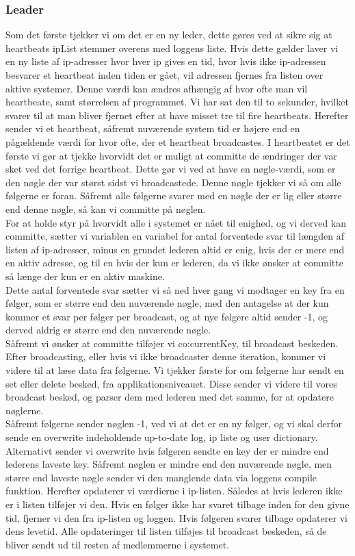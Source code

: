 \documentclass[a4paper,12pt]{article}
\begin{document}
\subsubsection{Leader}
Som det første tjekker vi om det er en ny leder, dette gøres ved at sikre sig at heartbeats ipList stemmer overens med loggens liste. Hvis dette gælder laver vi en ny liste af ip-adresser hvor hver ip gives en tid, hvor hvis ikke ip-adressen besvarer et heartbeat inden tiden er gået, vil adressen fjernes fra listen over aktive systemer. Denne værdi kan ændres afhængig af hvor ofte man vil heartbeate, samt størrelsen af programmet. Vi har sat den til to sekunder, hvilket svarer til at man bliver fjernet efter at have misset tre til fire heartbeats. 
Herefter sender vi et heartbeat, såfremt nuværende system tid er højere end en pågældende værdi for hvor ofte, der et heartbeat broadcastes. I heartbeatet er det første vi gør at tjekke hvorvidt det er muligt at committe de ændringer der var sket ved det forrige heartbeat. Dette gør vi ved at have en nøgle-værdi, som er den nøgle der var størst sidst vi broadcastede. Denne nøgle tjekker vi så om alle følgerne er foran. Såfremt alle følgerne svarer med en nøgle der er lig eller større end denne nøgle, så kan vi committe på nøglen.
\\
For at holde styr på hvorvidt alle i systemet er nået til enighed, og vi derved kan committe, sætter vi variablen en variabel for antal forventede svar til længden af listen af ip-adresser, minus en grundet lederen altid er enig, hvis der er mere end en aktiv adresse, og til en  hvis der kun er lederen, da vi ikke ønsker at committe så længe der kun er en aktiv maskine.
\\[5px]
Dette antal forventede svar sætter vi så ned hver gang vi modtager en key fra en følger, som er større end den nuværende nøgle, med den antagelse at der kun kommer et svar per følger per broadcast, og at nye følgere altid sender -1, og derved aldrig er større end den nuværende nøgle.
\\
Såfremt vi ønsker at committe tilføjer vi co:currentKey, til broadcast beskeden.
Efter broadcasting, eller hvis vi ikke broadcaster denne iteration, kommer vi videre til at læse data fra følgerne. Vi tjekker første for om følgerne har sendt en set eller delete besked, fra applikationsniveauet. Disse sender vi videre til vores broadcast besked, og parser dem med lederen med det samme, for at opdatere nøglerne.
\\
Såfremt følgerne sender nøglen -1, ved vi at det er en ny følger, og vi skal derfor sende en overwrite indeholdende up-to-date log, ip liste og user dictionary. Alternativt sender vi overwrite hvis følgeren sendte en key der er mindre end lederens laveste key.
Såfremt nøglen er mindre end den nuværende nøgle, men større end laveste nøgle sender vi den manglende data via loggens compile funktion.
Herefter opdaterer vi værdierne i ip-listen. Således at hvis lederen ikke er i listen tilføjer vi den. Hvis en følger ikke har svaret tilbage inden for den givne tid, fjerner vi den fra ip-listen og loggen. Hvis følgeren svarer tilbage opdaterer vi dens levetid. 
Alle opdateringer til listen tilføjes til broadcast beskeden, så de bliver sendt ud til resten af medlemmerne i systemet.
\end{document}
